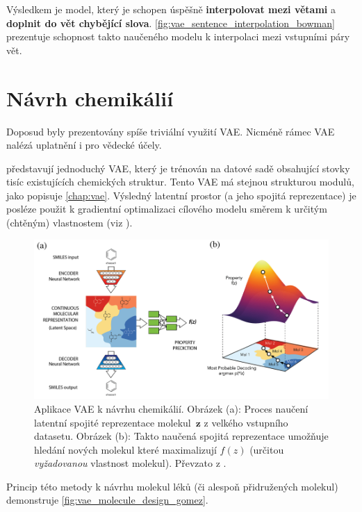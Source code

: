 Výsledkem je model, který je schopen úspěšně \textbf{interpolovat mezi větami} a \textbf{doplnit do vět chybějící slova}. \autoref{fig:vae_sentence_interpolation_bowman} prezentuje schopnost takto naučeného modelu k interpolaci mezi vstupními páry vět. \cite{Bowman2016}

\newpage
\section{Návrh chemikálií}
\label{sec:applications_chemical_pseudo_data_synthesis}
Doposud byly prezentovány spíše triviální využití VAE. Nicméně rámec VAE nalézá uplatnění i pro vědecké účely.
 

\textcite{GomezBombarelli2018} představují jednoduchý VAE, který je trénován na datové sadě obsahující stovky tisíc existujících chemických struktur.
Tento VAE má stejnou strukturou modulů, jako popisuje \autoref{chap:vae}.
Výsledný latentní prostor (a jeho spojitá reprezentace) je posléze použit k gradientní optimalizaci cílového modelu směrem k určitým (chtěným) vlastnostem (viz \textcite{GomezBombarelli2018}).

\begin{figure}[H]
    \centering
    \includegraphics[width=\textwidth]{figures/applications/vae_molecule_design_gomez.png}
    \caption{Aplikace VAE k návrhu chemikálií. Obrázek (a): Proces naučení latentní spojité reprezentace molekul $\mathbf{z}$ z velkého vstupního datasetu. Obrázek (b): Takto naučená spojitá reprezentace umožňuje hledání nových molekul které maximalizují $f(z)$ (určitou \emph{vyžadovanou} vlastnost molekul). Převzato z \textcite{GomezBombarelli2018}.}
    \label{fig:vae_molecule_design_gomez}
\end{figure}

Princip této metody k návrhu molekul léků (či alespoň přidružených molekul) demonstruje \autoref{fig:vae_molecule_design_gomez}. \cite{Kingma2019}

